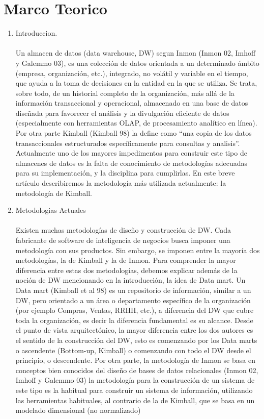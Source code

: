 \documentclass[preprint,12pt]{elsarticle}
\begin{document}
	

\section{Marco Teorico}

\begin{enumerate}[3.1]
    \item Introduccion. \\
\\
Un almacen de datos (data warehouse, DW) segun Inmon (Inmon 02, Imhoff y Galemmo 03), es una colecci\'on de datos orientada a un determinado \'ambito (empresa, organización, etc.), integrado, no volátil y variable en el tiempo, que ayuda a la toma de decisiones en la entidad en la que se utiliza. Se trata, sobre todo, de un historial completo de la organización, más allá de la información transaccional y operacional, almacenado en una base de datos diseñada para favorecer el análisis y la divulgación eficiente de datos (especialmente con herramientas OLAP, de procesamiento analítico en línea). Por otra parte Kimball (Kimball 98) la define como “una copia de los datos transaccionales estructurados específicamente para consultas y analisis”. Actualmente uno de los mayores impedimentos para construir este tipo de almacenes de datos es la falta de conocimiento de metodologías adecuadas para su implementación, y la disciplina para cumplirlas. En este breve art\'iculo describiremos la metodología más utilizada actualmente: la metodología de Kimball.

    \item Metodologias Actuales \\
\\
 Existen muchas metodologías de diseño y construcción de DW. Cada fabricante de software de inteligencia de negocios busca imponer una metodología con sus productos. Sin embargo, se imponen entre la mayoría dos metodologías, la de Kimball y la de Inmon. Para comprender la mayor diferencia entre estas dos metodologías, debemos explicar además de la noción de DW mencionando en la introducción, la idea de Data mart. Un Data mart (Kimball et al 98) es un repositorio de información, similar a un DW, pero orientado a un área o departamento específico de la  organización (por ejemplo Compras, Ventas, RRHH, etc.), a diferencia del DW que cubre toda la organización, es decir la diferencia fundamental es su alcance.
Desde el punto de vista arquitectónico, la mayor diferencia entre los dos autores es el sentido de la construcción del DW, esto es comenzando por los Data marts o ascendente (Bottom-up, Kimball) o comenzando con todo el DW desde el principio, o descendente.
Por otra parte, la metodología de Inmon se basa en conceptos bien conocidos del diseño de bases de datos relacionales (Inmon 02, Imhoff y Galemmo 03) la metodología para la construcción de un sistema de este tipo es la habitual para construir un sistema de información, utilizando las herramientas habituales, al contrario de la de Kimball, que se basa en un modelado dimensional (no normalizado)


\end{enumerate}
\end{document}
